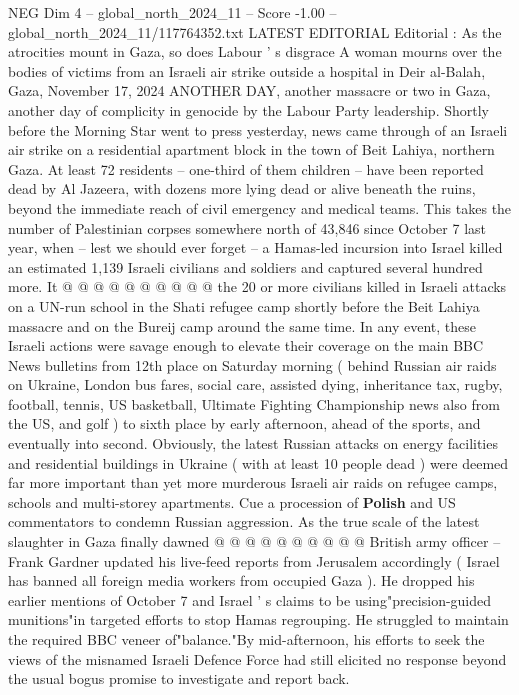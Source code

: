 \begin{textsample}{NEG Dim 4 – global\_north\_2024\_11 – Score -1.00 – global\_north\_2024\_11/117764352.txt}  \label{ex:f4_neg_171}
LATEST EDITORIAL Editorial : As the atrocities mount in Gaza, so does Labour ' s disgrace A woman mourns over the bodies of victims from an Israeli air strike outside a hospital in Deir al-Balah, Gaza, November 17, 2024 ANOTHER DAY, another massacre or two in Gaza, another day of complicity in genocide by the Labour Party leadership.
Shortly before the Morning Star went to press yesterday, news came through of an Israeli air strike on a residential apartment block in the town of Beit Lahiya, northern Gaza.
At least 72 residents -- one-third of them children -- have been reported dead by Al Jazeera, with dozens more lying dead or alive beneath the ruins, beyond the immediate reach of civil emergency and medical teams.
This takes the number of Palestinian corpses somewhere north of 43,846 since October 7 last year, when -- lest we should ever forget -- a Hamas-led incursion into Israel killed an estimated 1,139 Israeli civilians and soldiers and captured several hundred more.
It @ @ @ @ @ @ @ @ @ @ the 20 or more civilians killed in Israeli attacks on a UN-run school in the Shati refugee camp shortly before the Beit Lahiya massacre and on the Bureij camp around the same time.
In any event, these Israeli actions were savage enough to elevate their coverage on the main BBC News bulletins from 12th place on Saturday morning ( behind Russian air raids on Ukraine, London bus fares, social care, assisted dying, inheritance tax, rugby, football, tennis, US basketball, Ultimate Fighting Championship news also from the US, and golf ) to sixth place by early afternoon, ahead of the sports, and eventually into second.
Obviously, the latest Russian attacks on energy facilities and residential buildings in Ukraine ( with at least 10 people dead ) were deemed far more important than yet more murderous Israeli air raids on refugee camps, schools and multi-storey apartments.
Cue a procession of \textbf{Polish} and US commentators to condemn Russian aggression.
As the true scale of the latest slaughter in Gaza finally dawned @ @ @ @ @ @ @ @ @ @ British army officer -- Frank Gardner updated his live-feed reports from Jerusalem accordingly ( Israel has banned all foreign media workers from occupied Gaza ).
He dropped his earlier mentions of October 7 and Israel ' s claims to be using"precision-guided munitions"in targeted efforts to stop Hamas regrouping.
He struggled to maintain the required BBC veneer of"balance."By mid-afternoon, his efforts to seek the views of the misnamed Israeli Defence Force had still elicited no response beyond the usual bogus promise to investigate and report back.

\end{textsample}
